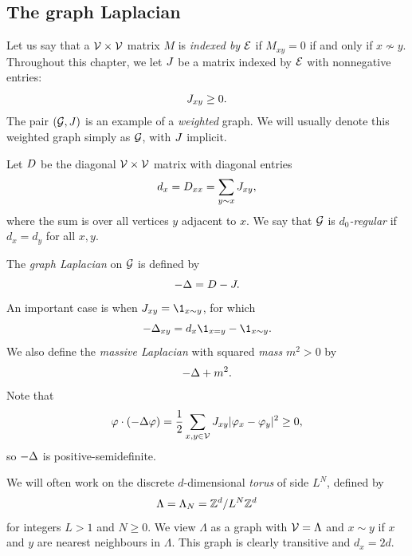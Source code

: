 
\subsection{The graph Laplacian}

Let us say that a $\mathcal{V}\times\mathcal{V}$ matrix $M$ is \emph{indexed by} $\mathcal{E}$
if $M_{xy} = 0$ if and only if $x \not\sim y$.
Throughout this chapter, we let $J$ be a matrix indexed by $\mathcal{E}$ with nonnegative entries:
\begin{equation}
J_{xy} \ge 0.
\end{equation}
The pair $(\mathcal{G}, J)$ is an example of a \emph{weighted} graph.
We will usually denote this weighted graph simply as $\mathcal{G}$, with $J$
implicit.

Let $D$ be the diagonal $\mathcal{V}\times\mathcal{V}$ matrix with diagonal entries
\begin{equation}
d_x = D_{xx} = \sum_{y \sim x} J_{xy},
\end{equation}
where the sum is over all vertices $y$ adjacent to $x$.
We say that $\mathcal{G}$ is \emph{$d_0$-regular} if $d_x = d_y$ for all $x, y$.

The \emph{graph Laplacian} on $\mathcal{G}$ is defined by
\begin{equation}
-\Delta = D - J.
\end{equation}
An important case is when $\jay_{xy} = \1_{x\sim y}$, for which
\begin{equation}
\label{e:Deltaxy}
-\Delta_{xy} = d_x \1_{x=y} - \1_{x \sim y}.
\end{equation}
We also define the \emph{massive Laplacian} with squared \emph{mass} $m^2 > 0$ by
\begin{equation}
-\Delta + m^2.
\end{equation}
Note that
\begin{equation}
\label{e:sbp-gen}
\varphi \cdot (-\Delta \varphi)
  =
\frac{1}{2} \sum_{x,y\in\mathcal{V}} J_{xy} |\varphi_x - \varphi_y|^2
  \ge
0,
\end{equation}
so $-\Delta$ is positive-semidefinite.

\begin{example}
We will often work on the discrete $d$-dimensional \emph{torus}
of side $L^N$, defined by
\begin{equation}
\label{e:Lambda-torus}
\Lambda = \Lambda_N = { {{\mathbb Z}}^d }/L^N{ {{\mathbb Z}}^d }
\end{equation}
for integers $L > 1$ and $N \ge 0$.
We view $\Lambda$ as a graph with $\mathcal{V} = \Lambda$ and $x \sim y$ if
$x$ and $y$ are nearest neighbours in $\Lambda$. This graph is clearly transitive
and $d_x = 2d$.
\end{example}


